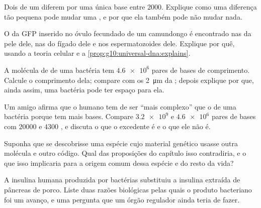 \begin{exercise}[$\star\star$]\label{exo:g10:universal-dna:10}
Dois  de um  diferem por uma única base entre 2000. Explique
como uma diferença tão pequena pode mudar uma , e por que ela
também pode não mudar nada.
\end{exercise}

\begin{exercise}[$\star\star$]\label{exo:g10:universal-dna:11}
O  da GFP inserido no óvulo fecundado de um camundongo é encontrado
nas  da pele dele, nas  do fígado dele e nos
espermatozoides dele. Explique por quê, usando a teoria celular e a
\cref{prop:g10:universal-dna:explains}.
\end{exercise}

\begin{exercise}[$\star\star\star$]\label{exo:g10:universal-dna:12}
A molécula de  de uma bactéria tem $\num{4.6e6}$ pares de bases de
comprimento. Calcule o comprimento dela; compare com os
\qty{2}{\micro m} da ; depois explique por que, ainda assim, uma
bactéria pode ter espaço para ela.
\end{exercise}

\begin{exercise}[$\star\star\star$]\label{exo:g10:universal-dna:13}
Um amigo afirma que o  humano tem de ser ``mais complexo'' que o de
uma bactéria porque tem mais bases. Compare $\num{3.2e9}$ e
$\num{4.6e6}$ pares de bases com $\num{20000}$ e 4300 , e discuta o
que o  excedente é e o que ele não é.
\end{exercise}

\begin{exercise}[$\star\star\star$]\label{exo:g10:universal-dna:14}
Suponha que se descobrisse uma espécie cujo material genético usasse
outra molécula e outro código. Qual das proposições do capítulo isso
contradiria, e o que isso implicaria para a origem comum dessa espécie
e do resto da vida?
\end{exercise}

\begin{exercise}[$\star\star\star$]\label{exo:g10:universal-dna:15}
A insulina humana produzida por bactérias substituiu a insulina
extraída de pâncreas de porco. Liste duas razões biológicas pelas quais
o produto bacteriano foi um avanço, e uma pergunta que um órgão
regulador ainda teria de fazer.
\end{exercise}

